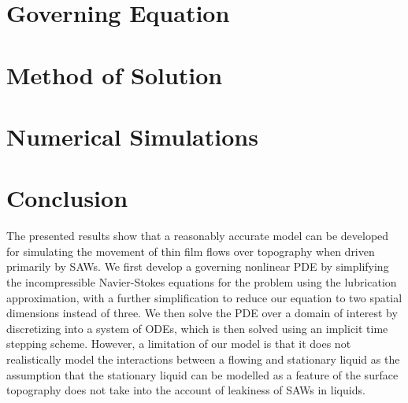 \documentclass[letterpaper]{article}
\begin{document}
\section{Governing Equation} \label{sec:gov_eq}

 
\section{Method of Solution} \label{sec:method_of_sol}


\section{Numerical Simulations} \label{sec:results}


\section{Conclusion} \label{sec:conclusion}
The presented results show that a reasonably accurate model can be developed for simulating the movement of thin 
film flows over topography when driven primarily by SAWs. We first develop a governing nonlinear PDE by simplifying the 
incompressible Navier-Stokes equations for the problem using the lubrication approximation, with a further simplification 
to reduce our equation to two spatial dimensions instead of three. We then solve the PDE over a domain of interest by discretizing 
into a system of ODEs, which is then solved using an implicit time stepping scheme. However, a limitation of our model is that 
it does not realistically model the interactions between a flowing and stationary liquid as the assumption that the stationary liquid can be 
modelled as a feature of the surface topography does not take into the account of leakiness of SAWs in liquids. 
\end{document}
